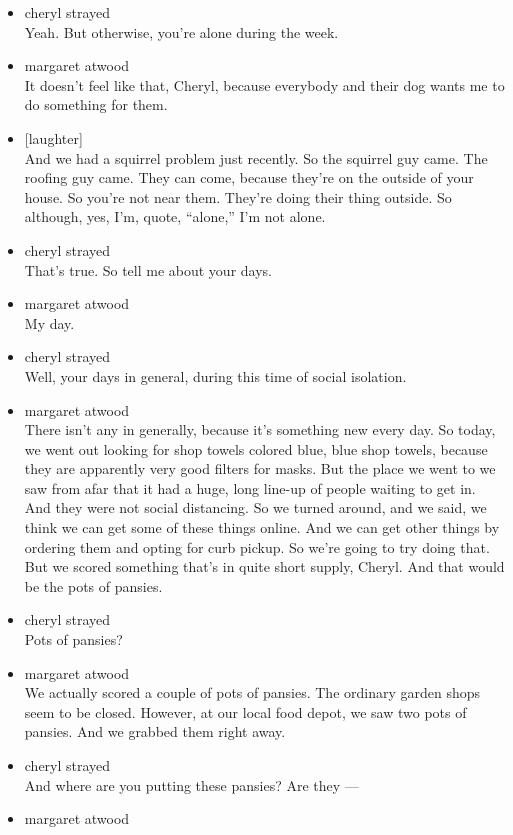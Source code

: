 \begin{itemize}
\item
  cheryl strayed\\
  Yeah. But otherwise, you're alone during the week.
\item
  margaret atwood\\
  It doesn't feel like that, Cheryl, because everybody and their dog
  wants me to do something for them.
\item
  {[}laughter{]}\\
  And we had a squirrel problem just recently. So the squirrel guy came.
  The roofing guy came. They can come, because they're on the outside of
  your house. So you're not near them. They're doing their thing
  outside. So although, yes, I'm, quote, ``alone,'' I'm not alone.
\item
  cheryl strayed\\
  That's true. So tell me about your days.
\item
  margaret atwood\\
  My day.
\item
  cheryl strayed\\
  Well, your days in general, during this time of social isolation.
\item
  margaret atwood\\
  There isn't any in generally, because it's something new every day. So
  today, we went out looking for shop towels colored blue, blue shop
  towels, because they are apparently very good filters for masks. But
  the place we went to we saw from afar that it had a huge, long line-up
  of people waiting to get in. And they were not social distancing. So
  we turned around, and we said, we think we can get some of these
  things online. And we can get other things by ordering them and opting
  for curb pickup. So we're going to try doing that. But we scored
  something that's in quite short supply, Cheryl. And that would be the
  pots of pansies.
\item
  cheryl strayed\\
  Pots of pansies?
\item
  margaret atwood\\
  We actually scored a couple of pots of pansies. The ordinary garden
  shops seem to be closed. However, at our local food depot, we saw two
  pots of pansies. And we grabbed them right away.
\item
  cheryl strayed\\
  And where are you putting these pansies? Are they ---
\item
  margaret atwood\\

\end{itemize}
